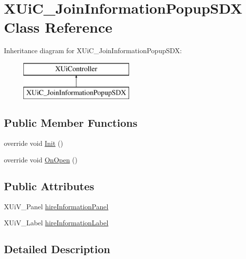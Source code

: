 \hypertarget{class_x_ui_c___join_information_popup_s_d_x}{}\section{X\+Ui\+C\+\_\+\+Join\+Information\+Popup\+S\+DX Class Reference}
\label{class_x_ui_c___join_information_popup_s_d_x}
Inheritance diagram for X\+Ui\+C\+\_\+\+Join\+Information\+Popup\+S\+DX\+:\begin{figure}[H]
\begin{center}
\leavevmode
\includegraphics[height=2.000000cm]{class_x_ui_c___join_information_popup_s_d_x}
\end{center}
\end{figure}
\subsection*{Public Member Functions}
\begin{DoxyCompactItemize}
\item 
override void \mbox{\hyperlink{class_x_ui_c___join_information_popup_s_d_x_a082249d975c4620867a377e6eaa0592a}{Init}} ()
\item 
override void \mbox{\hyperlink{class_x_ui_c___join_information_popup_s_d_x_ad1dbd19ce49236723af97ed4779f5bb8}{On\+Open}} ()
\end{DoxyCompactItemize}
\subsection*{Public Attributes}
\begin{DoxyCompactItemize}
\item 
X\+Ui\+V\+\_\+\+Panel \mbox{\hyperlink{class_x_ui_c___join_information_popup_s_d_x_a6a70d0fb5365be369bd36c8c84002861}{hire\+Information\+Panel}}
\item 
X\+Ui\+V\+\_\+\+Label \mbox{\hyperlink{class_x_ui_c___join_information_popup_s_d_x_ad53b9e62d87c0f846e168f6e161077b3}{hire\+Information\+Label}}
\end{DoxyCompactItemize}


\subsection{Detailed Description}


